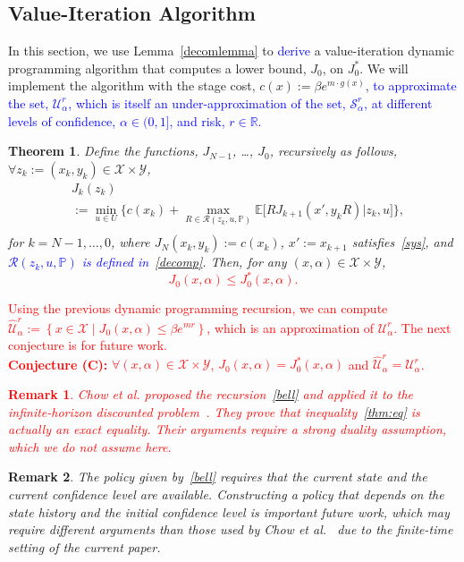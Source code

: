 \documentclass[letterpaper, 10 pt, conference]{ieeeconf}  %
\newtheorem{theorem}{Theorem}
\newtheorem{remark}{Remark}
\begin{document}
\subsection{Value-Iteration Algorithm}
In this section, we use Lemma~\ref{decomlemma} to \textcolor{blue}{derive} a value-iteration dynamic programming algorithm that computes a lower bound, $J_0$, on $J_0^*$.
We will implement the algorithm with the stage cost, $c(x) := \beta e^{m \cdot g(x)}$, 
\textcolor{blue}{to approximate the set, $\mathcal{U}_\alpha^r$, which is itself an under-approximation of the set, $\mathcal{S}_\alpha^r$, 
at different levels of confidence, $\alpha \in (0, 1]$, and risk, $r \in \mathbb{R}$.} 
%
\begin{theorem}
\label{thm}
Define the functions, $J_{N-1}$, \dots, $J_0$, recursively as follows, $\forall z_k := (x_k, y_k) \in \mathcal{X} \times \mathcal{Y}$,
\begin{equation}\begin{aligned}
&J_k(z_k) \\
& := {\underset{u \in U}\min} \Big\{ c(x_k) + {\underset{R \in \mathcal{R}(z_k, u, \mathbb{P})}\max} \mathbb{E}\big[ R J_{k+1}(x', y_k R) \big| z_k, u \big] \Big\}, \\
\label{bell}\end{aligned}\end{equation}
for $k = N-1, \dots, 0$, where $J_N(x_k, y_k) := c(x_k)$, $x' := x_{k+1}$ satisfies~\eqref{sys}, and \textcolor{blue}{$\mathcal{R}(z_k, u, \mathbb{P})$ is defined in~\eqref{decomp}}.  
Then, for any $(x, \alpha) \in \mathcal{X} \times \mathcal{Y}$,
\textcolor{red}{
\begin{equation}
\label{thm:eq}
J_0(x,\alpha) \leq J_0^*(x, \alpha).
\end{equation}
}
\end{theorem}
%
\textcolor{red}{Using the previous dynamic programming recursion, we can compute $\widehat{\mathcal{U}}_{\alpha}^r := \left\{ x \in \mathcal{X} \mid J_0(x, \alpha) \leq \beta e^{m r}\right\}$, which is an approximation of $\mathcal{U}_{\alpha}^r$. The next conjecture is for future work.\\
\textbf{Conjecture (C):} $\forall(x, \alpha) \in \mathcal{X} \times \mathcal{Y}$, $J_0(x, \alpha) = J^*_0(x, \alpha)$ and $\widehat{\mathcal{U}}_{\alpha}^r = \mathcal{U}_{\alpha}^r$.
%
\begin{remark}
Chow et al. proposed the recursion~\eqref{bell} and applied it to the infinite-horizon discounted problem~\cite{chow2015risk}. They prove that inequality~\eqref{thm:eq} is actually an exact equality. Their arguments require a strong duality assumption, which we do not assume here.
\end{remark}
}
%
\begin{remark}
The policy given by~\eqref{bell} requires that the current state and the current confidence level are available.
Constructing a policy that depends on the state history and the initial confidence level is important future work,
which may require different arguments than those used by Chow et al.~\cite{chow2015risk} due to the finite-time setting of the current paper.  %
\end{remark} 
\end{document}
